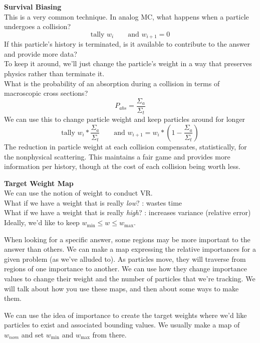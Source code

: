 \documentclass[12pt]{article}
\begin{document}
\textbf{Survival Biasing}\\
This is a very common technique. In analog MC, what happens when a particle undergoes a collision?
\[
\text{tally }w_i \qquad \text{and } w_{i+1} = 0
\]
If this particle's history is terminated, is it available to contribute to the answer and provide more data?\\
To keep it around, we'll just change the particle's weight in a way that preserves physics rather than terminate it. \\
What is the probability of an absorption during a collision in terms of macroscopic cross sections?
\[
P_{abs} = \frac{\Sigma_a}{\Sigma_t}
\]
We can use this to change particle weight and keep particles around for longer
\[
\text{tally }w_i*\frac{\Sigma_a}{\Sigma_t} \qquad \text{and } w_{i+1} = w_i*(1 - \frac{\Sigma_a}{\Sigma_t})
\]
The reduction in particle weight at each collision compensates, statistically, for the nonphysical scattering. This maintains a fair game and provides more information per history, though at the cost of each collision being worth less.

\textbf{Target Weight Map}\\
We can use the notion of weight to conduct VR. \\
What if we have a weight that is really \textit{low}? : wastes time\\
What if we have a weight that is really \textit{high}? : increases variance (relative error)\\
Ideally, we'd like to keep $w_{\min} \leq w \leq w_{\max}$.

When looking for a specific answer, some regions may be more important to the answer than others. We can make a map expressing the relative importances for a given problem (as we've alluded to). As particles move, they will traverse from regions of one importance to another. We can use how they change importance values to change their weight and the number of particles that we're tracking. We will talk about how you use these maps, and then about some ways to make them.

We can use the idea of importance to create the target weights where we'd like particles to exist and associated bounding values. We usually make a map of $w_{nom}$ and set $w_{\min}$ and $w_{\max}$ from there. 

\end{document}
